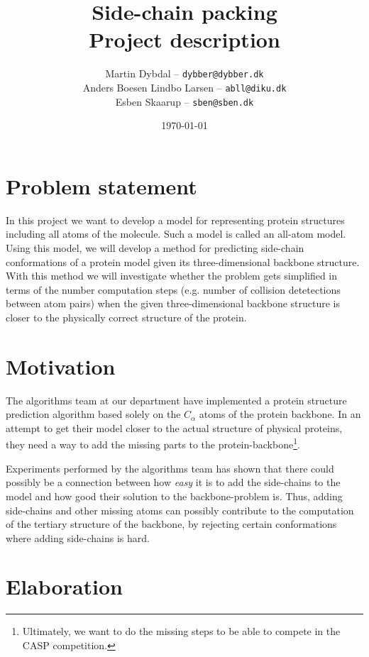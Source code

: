 \documentclass[10pt,a4paper,final,twoside,openany,article]{memoir}
\title{
  Side-chain packing \\
  \small{Project description}
}
\author{
	Martin Dybdal -- \texttt{dybber@dybber.dk}\\
	Anders Boesen Lindbo Larsen -- \texttt{abll@diku.dk} \\
    Esben Skaarup -- \texttt{sben@sben.dk}
}
\date{\today}
\begin{document}
\maketitle

\section{Problem statement}
In this project we want to develop a model for representing protein structures including all atoms of the molecule.
Such a model is called an all-atom model.
Using this model, we will develop a method for predicting side-chain
conformations of a protein model given its three-dimensional backbone
structure.
With this method we will investigate whether the problem gets simplified in terms of the number computation steps (e.g. number of collision detetections between atom pairs) when the given three-dimensional backbone structure is closer to the physically correct structure of the protein.

\section{Motivation}
The algorithms team at our department have implemented a protein
structure prediction algorithm based solely on the $C_\alpha$ atoms of
the protein backbone. In an attempt to get their model closer to the
actual structure of physical proteins, they need a way to add the
missing parts to the protein-backbone\footnote{Ultimately, we want to
  do the missing steps to be able to compete in the
  CASP competition.}.

Experiments performed by the algorithms team has shown that there
could possibly be a connection between how \textit{easy} it is to add
the side-chains to the model and how good their solution to the
backbone-problem is. Thus, adding side-chains and other missing atoms
can possibly contribute to the computation of the tertiary structure
of the backbone, by rejecting certain conformations where adding
side-chains is hard.

\section{Elaboration}

\begin{figure}
  \centering
\end{figure}
\end{document}
